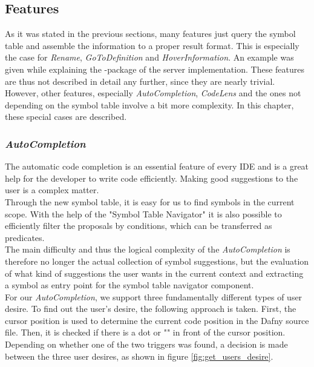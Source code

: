 \subsection{Features}
\label{section:imp:features}
As it was stated in the previous sections, many features just query the symbol table and assemble the information to a proper result format.
This is especially the case for \textit{Rename}, \textit{GoToDefinition} and \textit{HoverInformation}.
An example was given while explaining the -package of the server implementation.
These features are thus not described in detail any further, since they are nearly trivial.
However, other features, especially \textit{AutoCompletion}, \textit{CodeLens} and the ones not depending on the symbol table involve a bit more complexity.
In this chapter, these special cases are described.

\subsubsection{\textit{AutoCompletion}}
\label{section:implementation:core:completion}
The automatic code completion is an essential feature of every IDE and is a great help for the developer to write code efficiently.
Making good suggestions to the user is a complex matter. \\

Through the new symbol table, it is easy for us to find symbols in the current scope.
With the help of the "Symbol Table Navigator"
it is also possible to efficiently filter the proposals by conditions,
which can be transferred as predicates. \\

The main difficulty and thus the logical complexity of the \textit{AutoCompletion}
is therefore no longer the actual collection of symbol suggestions,
but the evaluation of what kind of suggestions the user wants in the current context
and extracting a symbol as entry point for the symbol table navigator component. \\

For our \textit{AutoCompletion}, we support three fundamentally different types of user desire.
To find out the user's desire, the following approach is taken.
First, the cursor position is used to determine the current code position in the Dafny source file.
Then, it is checked if there is a dot or "" in front of the cursor position.
Depending on whether one of the two triggers was found,
a decision is made between the three user desires, as shown in figure \ref{fig:get_users_desire}.

